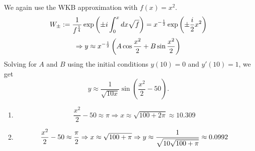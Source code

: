 \item
We again use the WKB approximation with $f(x) = x^2$.
\[
	W_\pm
	:= \frac{1}{f^{\frac{1}{4}}} \exp\left( \pm i \int_0^x dx \sqrt{f} \right)
	= x^{-\frac{1}{2}} \exp\left( \pm \frac{i}{2}x^2 \right)
\]
\[
	\Rightarrow y \approx x^{-\frac{1}{2}} \left( A \cos \frac{x^2}{2} + B \sin \frac{x^2}{2} \right)
\]
Solving for $A$ and $B$ using the initial conditions $y(10) = 0$ and $y'(10) = 1$, we get
\[
	y \approx \frac{1}{\sqrt{10x}} \sin\left( \frac{x^2}{2} - 50 \right).
\]

\begin{enumerate}[wide, labelindent = 0pt, label = (\alph*)]
	\item
	      \[
		      \frac{x^2}{2} - 50 \approx \pi
		      \Rightarrow x \approx \sqrt{100 + 2\pi} \approx 10.309
	      \]
	\item
	      \[
		      \frac{x^2}{2} - 50 \approx \frac{\pi}{2}
		      \Rightarrow x \approx \sqrt{100 + \pi}
		      \Rightarrow y \approx \frac{1}{\sqrt{10 \sqrt{100 + \pi}}} \approx 0.0992
	      \]

\end{enumerate}